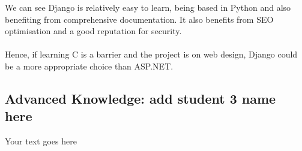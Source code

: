 \documentclass[a4paper, 11pt]{report}
\begin{document}
	We can see Django is relatively easy to learn, being based in Python and also benefiting from comprehensive documentation. It also benefits from SEO optimisation and a good reputation for security.
	\\
	\\Hence, if learning C is a barrier and the project is on web design, Django could be a more appropriate choice than ASP.NET.

	
	\subsection{Advanced Knowledge: add student 3 name here}
	
	Your text goes here
	
	
	
	
	
	\newpage
	
	
	
\end{document}
